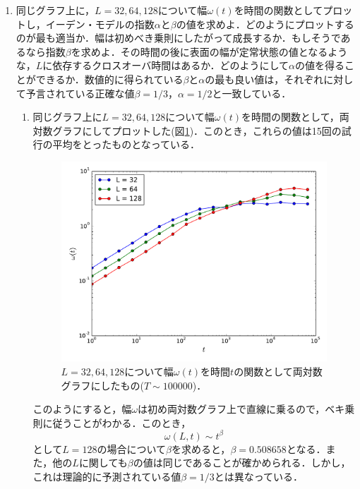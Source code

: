 \documentclass{jsarticle}
\begin{document}
\begin{enumerate}
            
        \item 同じグラフ上に，$L=32, 64, 128$について幅$\omega(t)$を時間の関数としてプロットし，イーデン・モデルの指数$\alpha$と$\beta$の値を求めよ．どのようにプロットするのが最も適当か．幅は初めべき乗則にしたがって成長するか．もしそうであるなら指数$\beta$を求めよ．その時間の後に表面の幅が定常状態の値となるような，$L$に依存するクロスオーバ時間はあるか．どのようにして$\alpha$の値を得ることができるか．数値的に得られている$\beta$と$\alpha$の最も良い値は，それぞれに対して予言されている正確な値$\beta=1/3$，$\alpha=1/2$と一致している．

            \begin{enumerate}
                \item 同じグラフ上に$L=32,64, 128$について幅$\omega(t)$を時間の関数として，両対数グラフにしてプロットした(図\ref{fig:14-12-f2})．このとき，これらの値は15回の試行の平均をとったものとなっている．
                \begin{figure}[H]
                    \begin{center}
                        \includegraphics[width=10.0cm]{figure_2.pdf}
                        \caption{$L=32,64,128$について幅$\omega(t)$を時間$t$の関数として両対数グラフにしたもの($T\sim 100000$)．}
                        \label{fig:14-12-f2}
                    \end{center}
                \end{figure}
                このようにすると，幅$\omega$は初め両対数グラフ上で直線に乗るので，ベキ乗則に従うことがわかる．このとき，
                \begin{equation}
                    \omega(L,t) \sim t^{\beta}
                \end{equation}
                として$L=128$の場合について$\beta$を求めると，$\beta=0.508658$となる．また，他の$L$に関しても$\beta$の値は同じであることが確かめられる．しかし，これは理論的に予測されている値$\beta=1/3$とは異なっている．

\end{enumerate}
\end{enumerate}
\end{document}
